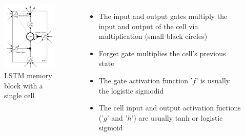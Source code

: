 \documentclass{beamer}
\begin{document}
{
	\begin{columns}
		\begin{figure}[ht]  
			\begin{center}
				\includegraphics[width=1.8in]{Images/LSTM_detail.png}   
			\end{center}   
			\caption{\centering LSTM memory block with a single cell}
		\end{figure}
		\begin{itemize}
			\item The input and output gates multiply the input and output of the cell via multiplication (small black circles)
			\item Forget gate multiplies the cell's previous state
			\item The gate activation function '${ f }$' is usually the logistic sigmodid
			\item The cell input and output activation fuctions ('${ g }$' and '${ h }$') are usually tanh or logistic sigmoid
		\end{itemize}
	\end{columns}
}
\frame
\end{document}
